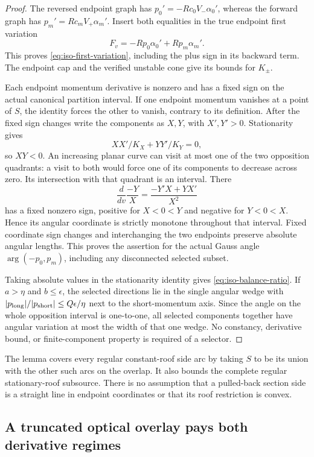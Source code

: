 \begin{proof}
The reversed endpoint graph has
$p_0'=-Rc_0V_-\alpha_0'$, whereas the forward graph has
$p_m'=Rc_mV_+\alpha_m'$. Insert both equalities in the true
endpoint first variation
\[
 F_v=-Rp_0\alpha_0'+Rp_m\alpha_m'.
\]
This proves \eqref{eq:iso-first-variation}, including the plus
sign in its backward term. The endpoint cap and the verified
unstable cone give its bounds for $K_\pm$.

Each endpoint momentum derivative is nonzero and has a fixed sign
on the actual canonical partition interval. If one endpoint
momentum vanishes at a point of $S$, the identity forces the other
to vanish, contrary to its definition. After the fixed sign changes
write the components as $X,Y$, with $X',Y'>0$. Stationarity gives
\[
             XX'/K_X+YY'/K_Y=0,
\]
so $XY<0$. An increasing planar curve can visit at most one of
the two opposition quadrants: a visit to both would force one
of its components to decrease across zero. Its intersection with
that quadrant is an interval. There
\[
 \frac{d}{dv}\frac{-Y}{X}
       =\frac{-Y'X+YX'}{X^2}
\]
has a fixed nonzero sign, positive for $X<0<Y$ and negative for
$Y<0<X$. Hence its angular coordinate is strictly monotone
throughout that interval. Fixed coordinate sign changes and
interchanging the two endpoints preserve absolute angular lengths.
This proves the assertion for the actual Gauss angle
$\arg(-p_0,p_m)$, including any disconnected selected subset.

Taking absolute values in the stationarity identity gives
\eqref{eq:iso-balance-ratio}. If $a>\eta$ and $b\le\epsilon$,
the selected directions lie in the single angular wedge with
$|p_{\rm long}|/|p_{\rm short}|\le Q\epsilon/\eta$ next to
the short-momentum axis. Since the angle on the whole opposition
interval is one-to-one, all selected components together have
angular variation at most the width of that one wedge.
No constancy, derivative bound, or finite-component property
is required of a selector.
\end{proof}

The lemma covers every regular constant-roof side arc by taking
$S$ to be its union with the other such arcs on the overlap.
It also bounds the complete regular stationary-roof subsource.
There is no assumption that a pulled-back section side is a straight
line in endpoint coordinates or that its roof restriction is convex.

\subsection{A truncated optical overlay pays both derivative regimes}

